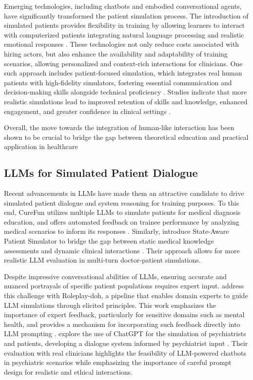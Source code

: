 Emerging technologies, including chatbots and embodied conversational agents, have significantly transformed the patient simulation process. The introduction of simulated patients provides flexibility in training by allowing learners to interact with computerized patients integrating natural language processing and realistic emotional responses \cite{hubal2000virtual}. These technologies not only reduce costs associated with hiring actors, but also enhance the availability and adaptability of training scenarios, allowing personalized and context-rich interactions for clinicians. One such approach includes patient-focused simulation, which integrates real human patients with high-fidelity simulators, fostering essential communication and decision-making skills alongside technical proficiency \cite{bartlett2021high}. Studies indicate that more realistic simulations lead to improved retention of skills and knowledge, enhanced engagement, and greater confidence in clinical settings \cite{kneebone2006human}.  

Overall, the move towards the integration of human-like interaction has been shown to be crucial to bridge the gap between theoretical education and practical application in healthcare  \cite{bartlett2021high, kneebone2006human, sarker2007simulation}

\subsection{LLMs for Simulated Patient Dialogue}
Recent advancements in LLMs have made them an attractive candidate to drive simulated patient dialogue and system reasoning for training purposes. To this end, CureFun utilizes multiple LLMs to simulate patients for medical diagnosis education, and offers automated feedback on trainee performance by analyzing medical scenarios to inform its responses \cite{li2024leveraging}. Similarly, \citeauthor{liao2024automatic} introduce State-Aware Patient Simulator to bridge the gap between static medical knowledge assessments and dynamic clinical interactions \cite{liao2024automatic}. Their approach allows for more realistic LLM evaluation in multi-turn doctor-patient simulations.

Despite impressive conversational abilities of LLMs, ensuring accurate and nuanced portrayals of specific patient populations requires expert input. \citeauthor{louie2024roleplay} address this challenge with Roleplay-doh, a pipeline that enables domain experts to guide LLM simulations through elicited principles. This work emphasizes the importance of expert feedback, particularly for sensitive domains such as mental health, and provides a mechanism for incorporating such feedback directly into LLM prompting \cite{louie2024roleplay}. \citeauthor{chen2023llm} explore the use of ChatGPT for the simulation of psychiatrists and patients, developing a dialogue system informed by psychiatrist input \cite{chen2023llm}. Their evaluation with real clinicians highlights the feasibility of LLM-powered chatbots in psychiatric scenarios while emphasizing the importance of careful prompt design for realistic and ethical interactions.

